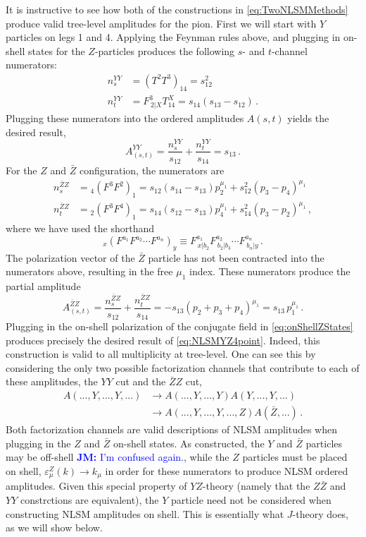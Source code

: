 \documentclass[11pt,letter]{article}
\newcommand{\jm}[1]{\textcolor{blue}{\textbf{JM: }{#1}}}
\def\be{\begin{equation}}
\begin{document}
It is instructive to see how both of the constructions in \cref{eq:TwoNLSMMethods} produce valid tree-level amplitudes for the pion. First we will start with $Y$ particles on legs 1 and 4. Applying the Feynman rules above, and plugging in on-shell states for the $Z$-particles produces the following $s$- and $t$-channel numerators:
\begin{align}
n^{YY}_s &= (T^2T^3)_{14} = s_{12}^2 
\\
 n^{YY}_t &=  F^{3}_{\,2|X}T^X_{14}  = s_{14}(s_{13}-s_{12})\, .
\end{align}
Plugging these numerators into the ordered amplitudes $A(s,t)$ yields the desired result,
\be\label{eq:NLSMYZ4point}
A^{YY}_{(s,t)} = \frac{n^{YY}_s}{s_{12}}+\frac{ n^{YY}_t }{s_{14}} = s_{13}\, .
\end{equation}
For the $Z$ and $\bar{Z}$ configuration, the numerators are 
\begin{align}
n^{\bar{Z}Z}_s &= {}_4(F^{3}F^{2})_{1} =  s_{12}(s_{14}-s_{13})p_2^{\mu_1}+s_{12}^2(p_3-p_4)^{\mu_1}
\\
 n^{\bar{Z}Z}_t &=   {}_2(F^{3}F^{4})_{1}  = s_{14}(s_{12}-s_{13})p_4^{\mu_1}+s_{14}^2(p_3-p_2)^{\mu_1}\, ,
\end{align}
where we have used the shorthand
\begin{equation}
{}_x(F^{a_1}F^{a_2}\cdots F^{a_n})_{y} \equiv F^{a_1}_{\,x|b_2}F^{a_2}_{\,b_2|b_3}\cdots F^{a_n}_{\,b_n|y}\, .
\end{equation}
The polarization vector of the $\bar{Z}$ particle has not been contracted into the numerators above, resulting in the free $\mu_1$ index.
These numerators produce the partial amplitude
\begin{equation}
A^{\bar{Z}Z}_{(s,t)} = \frac{n^{\bar{Z}Z}_s}{s_{12}}+\frac{ n^{\bar{Z}Z}_t }{s_{14}} = -s_{13}(p_2+p_3+p_4)^{\mu_1} = s_{13} \,p_1^{\mu_1}\, .
\end{equation}
Plugging in the on-shell polarization of the conjugate field in \cref{eq:onShellZStates} produces precisely the desired result of \cref{eq:NLSMYZ4point}. Indeed, this construction is valid to all multiplicity at tree-level. One can see this by considering the only two possible factorization channels that contribute to each of these amplitudes, the $YY$ cut and the $\bar{Z}Z$ cut,
\begin{align} \label{YZCut1}
A(...,Y,...,Y,...) &\rightarrow A(...,Y,...,Y)A(Y,...,Y,...)
\\
&\rightarrow A(...,Y,...,Y,...,Z)A(\bar{Z},...) \, . \label{YZCut2}
\end{align}
Both factorization channels are valid descriptions of NLSM amplitudes when plugging in the $Z$ and $\bar{Z}$ on-shell states. As constructed, the $Y$ and $\bar{Z}$ particles may be off-shell \jm{I'm confused again.}, while the $Z$ particles must be placed on shell, $\varepsilon^Z_\mu(k)\rightarrow k_\mu$ in order for these numerators to produce NLSM ordered amplitudes. Given this special property of $YZ$-theory (namely that the $Z\bar{Z}$ and $YY$ constrctions are equivalent), the $Y$ particle need not be considered when constructing NLSM amplitudes on shell. This is essentially what $J$-theory does, as we will show below.
\end{document}
